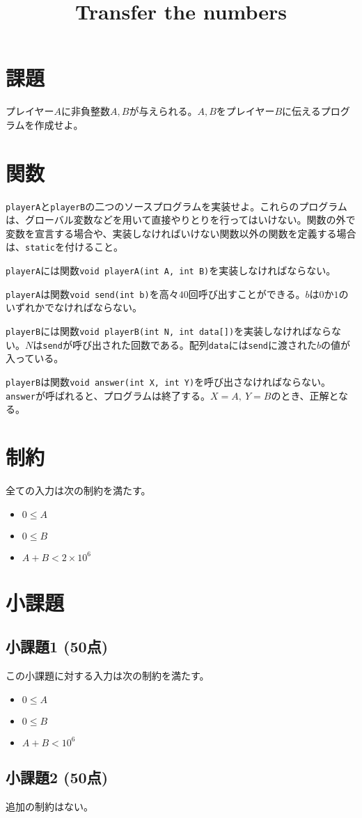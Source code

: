 \documentclass[10pt,a4j,notitlepage,uplatex]{jsarticle}
\title{Transfer the numbers}
\begin{document}
\section{課題}

プレイヤー$A$に非負整数$A, B$が与えられる。$A, B$をプレイヤー$B$に伝えるプログラムを作成せよ。

\section{関数}

\texttt{playerA}と\texttt{playerB}の二つのソースプログラムを実装せよ。これらのプログラムは、グローバル変数などを用いて直接やりとりを行ってはいけない。関数の外で変数を宣言する場合や、実装しなければいけない関数以外の関数を定義する場合は、\texttt{static}を付けること。

\texttt{playerA}には関数\texttt{void playerA(int A, int B)}を実装しなければならない。

\texttt{playerA}は関数\texttt{void send(int b)}を高々$40$回呼び出すことができる。$b$は$0$か$1$のいずれかでなければならない。

\texttt{playerB}には関数\texttt{void playerB(int N, int data[])}を実装しなければならない。$N$は\texttt{send}が呼び出された回数である。配列\texttt{data}には\texttt{send}に渡された$b$の値が入っている。

\texttt{playerB}は関数\texttt{void answer(int X, int Y)}を呼び出さなければならない。\texttt{answer}が呼ばれると、プログラムは終了する。$X = A, \ Y = B$のとき、正解となる。


\section{制約}

全ての入力は次の制約を満たす。
\begin{itemize}
  \item $0 \leq A$
  \item $0 \leq B$
  \item $A + B < 2 \times 10^{6}$
\end{itemize}

\section{小課題}

\subsection{小課題1 (50点)}

この小課題に対する入力は次の制約を満たす。
\begin{itemize}
  \item $0 \leq A$
  \item $0 \leq B$
  \item $A + B < 10^{6}$
\end{itemize}

\subsection{小課題2 (50点)}

追加の制約はない。
\end{document}
